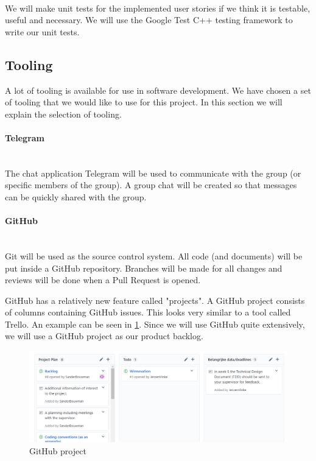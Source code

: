 ~\\

We will make unit tests for the implemented user stories if we think it is testable, useful and necessary. We will use the Google Test C++ testing framework to write our unit tests.

\subsection{Tooling}
A lot of tooling is available for use in software development. We have chosen a set of tooling that we would like to use for this project. In this section we will explain the selection of tooling.

\paragraph{Telegram}
~\\ The chat application Telegram will be used to communicate with the group (or specific members of the group). A group chat will be created so that messages can be quickly shared with the group.

\paragraph{GitHub}
~\\ Git will be used as the source control system. All code (and documents) will be put inside a GitHub repository. Branches will be made for all changes and reviews will be done when a Pull Request is opened.

GitHub has a relatively new feature called "projects". A GitHub project consists of columns containing GitHub issues. This looks very similar to a tool called Trello. An example can be seen in \cref{fig:githubproject}. Since we will use GitHub quite extensively, we will use a GitHub project as our product backlog.

\begin{figure}
    \centering
    \includegraphics[scale=0.75]{images/github-projects.PNG}
    \caption{GitHub project}\label{fig:githubproject}
\end{figure}

